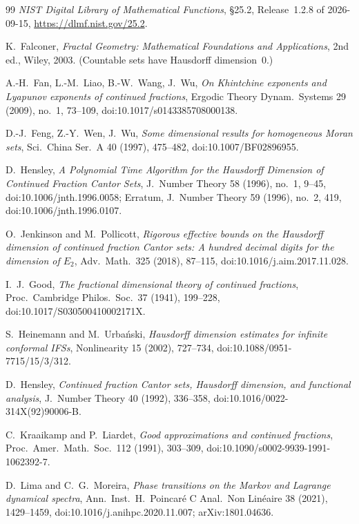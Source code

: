 \begin{thebibliography}{99}
 \emph{NIST Digital Library of Mathematical Functions}, \S25.2,
Release~1.2.8 of 2026-09-15, \url{https://dlmf.nist.gov/25.2}.

 K.~Falconer, \emph{Fractal Geometry: Mathematical
Foundations and Applications}, 2nd ed., Wiley, 2003. (Countable sets have
Hausdorff dimension~$0$.)

 A.-H.~Fan, L.-M.~Liao, B.-W.~Wang, J.~Wu, \emph{On Khintchine
exponents and Lyapunov exponents of continued fractions}, Ergodic Theory Dynam.\ Systems 29 (2009), no.~1, 73--109, doi:10.1017/s0143385708000138.

 D.-J.~Feng, Z.-Y.~Wen, J.~Wu, \emph{Some dimensional results
for homogeneous Moran sets}, Sci.\ China Ser.\ A 40 (1997), 475--482,
doi:10.1007/BF02896955.

 D.~Hensley, \emph{A Polynomial Time Algorithm for the
Hausdorff Dimension of Continued Fraction Cantor Sets}, J.\ Number Theory 58 (1996),
no.~1, 9--45, doi:10.1006/jnth.1996.0058; Erratum, J.\ Number Theory 59 (1996),
no.~2, 419, doi:10.1006/jnth.1996.0107.

 O.~Jenkinson and M.~Pollicott, \emph{Rigorous effective bounds
on the Hausdorff dimension of continued fraction Cantor sets: A hundred decimal digits
for the dimension of $E_2$}, Adv.\ Math.\ 325 (2018), 87--115,
doi:10.1016/j.aim.2017.11.028.

{\sloppy
{} I.~J.~Good, \emph{The fractional dimensional theory of continued
fractions}, Proc.\ Cambridge Philos.\ Soc.\ 37 (1941), 199--228,
doi:10.1017/S030500410002171X.
}

{\sloppy
{} S.~Heinemann and M.~Urba\'nski, \emph{Hausdorff dimension estimates
for infinite conformal IFSs}, Nonlinearity 15 (2002), 727--734,
doi:10.1088/0951-7715/15/3/312.
}

{\sloppy
{} D.~Hensley, \emph{Continued fraction Cantor sets, Hausdorff
dimension, and functional analysis}, J.\ Number Theory 40 (1992), 336--358,
doi:10.1016/0022-314X(92)90006-B.
}

 C.~Kraaikamp and P.~Liardet, \emph{Good approximations and
continued fractions}, Proc.\ Amer.\ Math.\ Soc.\ 112 (1991), 303--309, doi:10.1090/s0002-9939-1991-1062392-7.

 D.~Lima and C.~G.~Moreira, \emph{Phase transitions on
the Markov and Lagrange dynamical spectra}, Ann.\ Inst.\ H.~Poincar\'e
C Anal.\ Non Lin\'eaire 38 (2021), 1429--1459,
doi:10.1016/j.anihpc.2020.11.007; arXiv:1801.04636.


\end{thebibliography}
